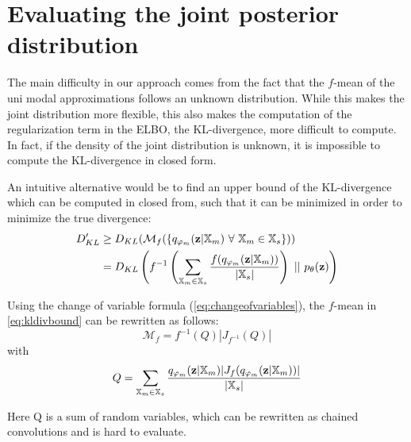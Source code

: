 
\section{Evaluating the joint posterior distribution}
The main difficulty in our approach comes from the fact that the $f$-mean of the uni modal approximations follows an unknown distribution.
While this makes the joint distribution more flexible, this also makes the computation of the regularization term in the ELBO, the KL-divergence, more difficult to compute.
In fact, if the density of the joint distribution is unknown, it is impossible to compute the KL-divergence in closed form.

An intuitive alternative would be to find an upper bound of the KL-divergence which can be computed in closed from, such that it can be minimized in order to minimize the true divergence:
\begin{equation}
    \label{eq:kldivbound}
    \begin{split}
    D_{KL}^{\prime} &\geq D_{KL}(\mathcal{M}_f(\{\unimodalpost\ \forall\ \xsetm \in \xsubset\}))\\
    &=  D_{KL}\left(f^{-1}\left(\sum _{\xsetm \in \xsubset} \frac{f(\unimodalpost)}{|\xsubset|}\right)\ ||\ \prior\right)
    \end{split}
\end{equation}

Using the change of variable formula (\cref{eq:changeofvariables}), the $f$-mean in \cref{eq:kldivbound} can be rewritten as follows:
\begin{equation}
    \mathcal{M}_f = f^{-1}(Q)|J_{f^{-1}}(Q)|
\end{equation}
with
\begin{equation}
    Q= \sum _{\mathbb{X}_m \in \mathbb{X}_s} \frac{q_{\varphi_m}(\textbf{z}|\mathbb{X}_m)|J_f(q_{\varphi_m}(\textbf{z}|\mathbb{X}_m))|}{|\mathbb{X}_s|}
\end{equation}

Here Q is a sum of random variables, which can be rewritten as chained convolutions \citep{sorv} and is hard to evaluate.


